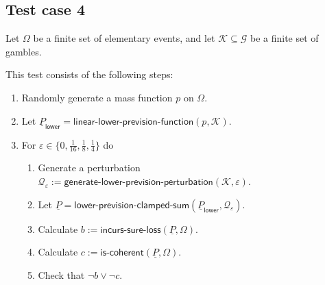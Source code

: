 \documentclass{article}
\theoremstyle{mytheorem}
\newcommand{\func}[1]{\ensuremath{\textsf{#1}}} %
\newcommand{\set}[1]{\ensuremath{\{ #1 \} }} %
\begin{document}
\clearpage
\subsection{Test case 4}
Let $\Omega$ be a finite set of elementary events, and let $\mathcal{K} \subseteq \mathcal{G}$ be a finite set of gambles. 

\vspace{0.5cm}
\noindent
This test consists of the following steps:
\begin{enumerate}
    \item Randomly generate a mass function $p$ on $\Omega$.
    \item Let $\underline{P}_\func{lower} = \func{linear-lower-prevision-function}(p, \mathcal{K})$.
    \item For $\varepsilon \in \set{0, \frac{1}{16}, \frac{1}{8}, \frac{1}{4}}$ do
    \begin{enumerate}    
        \item Generate a perturbation $\mathcal{Q}_\varepsilon := \func{generate-lower-prevision-perturbation}(\mathcal{K}, \varepsilon)$.
        \item Let $\underline{P} = \func{lower-prevision-clamped-sum}(\underline{P}_\func{lower}, \mathcal{Q}_\varepsilon)$.
        \item Calculate $b := \func{incurs-sure-loss}(\underline{P}, \Omega)$.
        \item Calculate $c := \func{is-coherent}(\underline{P}, \Omega)$.
        \item Check that $\neg b \lor \neg c$.
    \end{enumerate}    
\end{enumerate}

\clearpage


\end{document}
